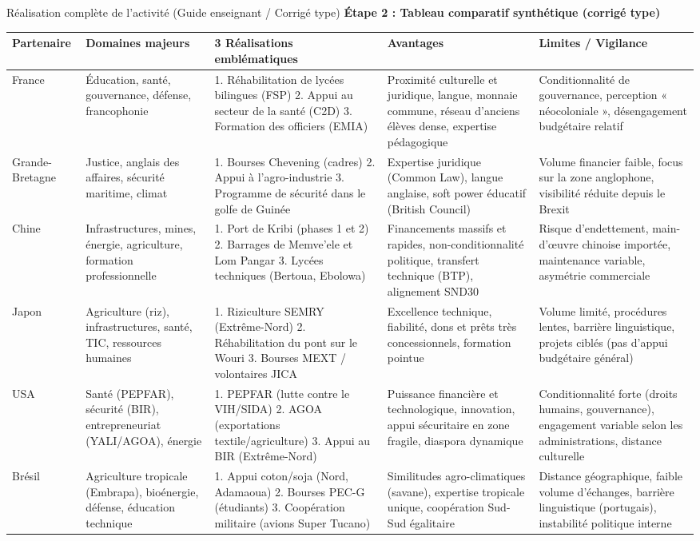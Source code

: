 \documentclass[11pt]{article}
\begin{document}
\begin{exoresolu}{Réalisation complète de l'activité (Guide enseignant / Corrigé type)}
\medskip
\noindent \textbf{Étape 2 : Tableau comparatif synthétique (corrigé type)}
\begin{center}
\begin{tabularx}{\linewidth}{|l|X|X|X|X|}\hline
\rowcolor{popblueL}
\textbf{Partenaire} & \textbf{Domaines majeurs} & \textbf{3 Réalisations emblématiques} & \textbf{Avantages} & \textbf{Limites / Vigilance} \\ \hline
France & Éducation, santé, gouvernance, défense, francophonie & 1. Réhabilitation de lycées bilingues (FSP) 2. Appui au secteur de la santé (C2D) 3. Formation des officiers (EMIA) & Proximité culturelle et juridique, langue, monnaie commune, réseau d'anciens élèves dense, expertise pédagogique & Conditionnalité de gouvernance, perception « néocoloniale », désengagement budgétaire relatif \\ \hline
Grande-Bretagne & Justice, anglais des affaires, sécurité maritime, climat & 1. Bourses Chevening (cadres) 2. Appui à l'agro-industrie 3. Programme de sécurité dans le golfe de Guinée & Expertise juridique (Common Law), langue anglaise, soft power éducatif (British Council) & Volume financier faible, focus sur la zone anglophone, visibilité réduite depuis le Brexit \\ \hline
Chine & Infrastructures, mines, énergie, agriculture, formation professionnelle & 1. Port de Kribi (phases 1 et 2) 2. Barrages de Memve'ele et Lom Pangar 3. Lycées techniques (Bertoua, Ebolowa) & Financements massifs et rapides, non-conditionnalité politique, transfert technique (BTP), alignement SND30 & Risque d'endettement, main-d'œuvre chinoise importée, maintenance variable, asymétrie commerciale \\ \hline
Japon & Agriculture (riz), infrastructures, santé, TIC, ressources humaines & 1. Riziculture SEMRY (Extrême-Nord) 2. Réhabilitation du pont sur le Wouri 3. Bourses MEXT / volontaires JICA & Excellence technique, fiabilité, dons et prêts très concessionnels, formation pointue & Volume limité, procédures lentes, barrière linguistique, projets ciblés (pas d'appui budgétaire général) \\ \hline
USA & Santé (PEPFAR), sécurité (BIR), entrepreneuriat (YALI/AGOA), énergie & 1. PEPFAR (lutte contre le VIH/SIDA) 2. AGOA (exportations textile/agriculture) 3. Appui au BIR (Extrême-Nord) & Puissance financière et technologique, innovation, appui sécuritaire en zone fragile, diaspora dynamique & Conditionnalité forte (droits humains, gouvernance), engagement variable selon les administrations, distance culturelle \\ \hline
Brésil & Agriculture tropicale (Embrapa), bioénergie, défense, éducation technique & 1. Appui coton/soja (Nord, Adamaoua) 2. Bourses PEC-G (étudiants) 3. Coopération militaire (avions Super Tucano) & Similitudes agro-climatiques (savane), expertise tropicale unique, coopération Sud-Sud égalitaire & Distance géographique, faible volume d'échanges, barrière linguistique (portugais), instabilité politique interne \\ \hline
\end{tabularx}
\end{center}


\end{exoresolu}
\end{document}

